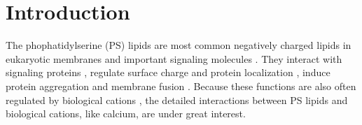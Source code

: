 \documentclass[journal=jpcbfk,manuscript=article]{achemso}
\begin{document}
 
 
 
 
 
 
\section{Introduction} 

The phophatidylserine (PS) lipids are most common negatively charged lipids in eukaryotic membranes
and important signaling molecules \cite{lemmon08,leventis10,li14}.
They interact with signaling proteins \cite{leventis10},
regulate surface charge and protein localization \cite{yeung08}, 
induce protein aggregation \cite{zhao04,gorbenko06} and membrane fusion \cite{??}.
Because these functions are also often regulated by biological cations \cite{leventis10},
the detailed interactions between PS lipids and biological cations, like calcium, are under great interest.
\end{document}
